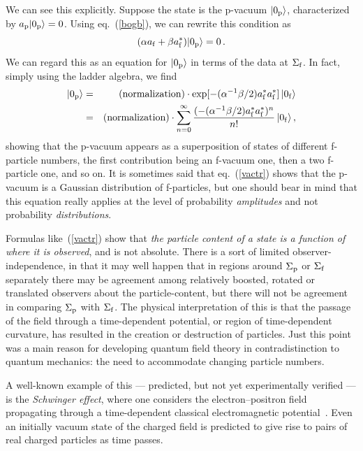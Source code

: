 \documentclass[12pt]{article}
\begin{document}
We can see this explicitly.  Suppose the state is the p-vacuum $|0_{\rm p}\rangle$, characterized by $a_{\rm p}|0_{\rm p}\rangle =0$.  Using eq.~(\ref{bogb}), we can rewrite this condition as
\begin{equation}
 (\alpha  a_{\rm f}
  +\beta a^*_{\rm f})|0_{\rm p}\rangle =0\, .
\end{equation}
We can regard this as an equation for $|0_{\rm p}\rangle$ in terms of the data at $\Sigma _{\rm f}$.  In fact, simply using the ladder algebra, we find
\begin{eqnarray}\label{vactr}
  |0_{\rm p}\rangle &=&\mbox{(normalization)}\cdot
      \exp [-(\alpha ^{-1}\beta /2)a^*_{\rm f}a^*_{\rm f}]
   \, |0_{\rm f}\rangle\\
&=&\mbox{(normalization)}\cdot 
  \sum _{n=0}^\infty \frac{(-(\alpha ^{-1}\beta /2)a^*_{\rm f}a^*_{\rm f})^n}{n!}\, 
  |0_{\rm f}\rangle \, ,
\end{eqnarray}
showing that the p-vacuum appears as a superposition of states of different f-particle numbers, the first contribution being an f-vacuum one, then a two f-particle one, and so on.  It is sometimes said that eq.~(\ref{vactr}) shows that the p-vacuum is a Gaussian distribution of 
f-particles, but one should bear in mind that this equation really applies at the level of probability {\em amplitudes} and not probability {\em distributions}.

Formulas like~(\ref{vactr}) show that {\em the particle content of a state is a function of where it is observed}, and is not absolute.  
There is a sort of limited observer-independence, in that it may well happen that in regions around $\Sigma _{\rm p}$ or $\Sigma _{\rm f}$ separately there may be agreement among relatively boosted, rotated or translated observers about the particle-content, but there will not be agreement in comparing $\Sigma _{\rm p}$ with $\Sigma _{\rm f}$.
The physical interpretation of this is that the passage of the field through a time-dependent potential, or region of time-dependent curvature, has resulted in the creation or destruction of particles.  Just this point was a main reason for developing quantum field theory in contradistinction to quantum mechanics:  the need to accommodate changing particle numbers.

A well-known example of this --- predicted, but not yet experimentally verified --- is the {\em Schwinger effect}, where one considers the electron--positron field propagating through a time-dependent classical electromagnetic potential~\citep{Schwinger:1951nm}.
Even an initially vacuum state of the charged field is predicted to give rise to pairs of real charged particles as time passes.
\end{document}
